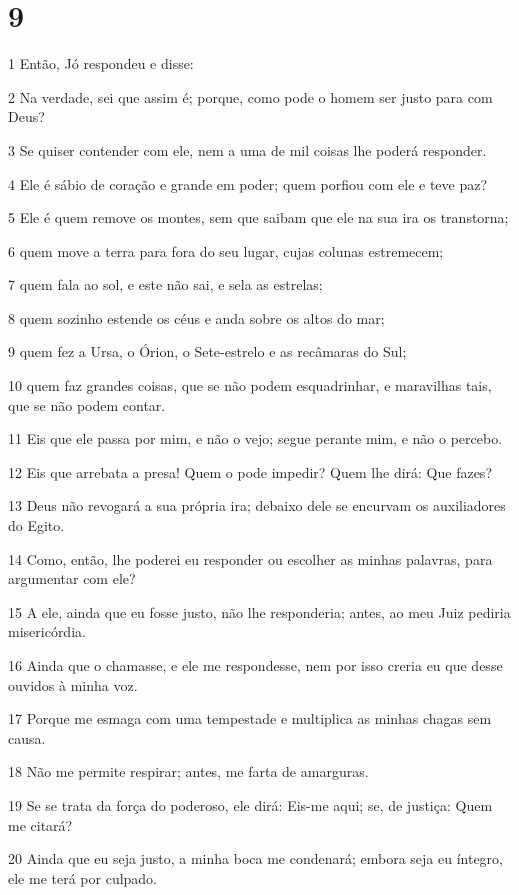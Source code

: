 \chapter{9}

\par 1 Então, Jó respondeu e disse:
\par 2 Na verdade, sei que assim é; porque, como pode o homem ser justo para com Deus?
\par 3 Se quiser contender com ele, nem a uma de mil coisas lhe poderá responder.
\par 4 Ele é sábio de coração e grande em poder; quem porfiou com ele e teve paz?
\par 5 Ele é quem remove os montes, sem que saibam que ele na sua ira os transtorna;
\par 6 quem move a terra para fora do seu lugar, cujas colunas estremecem;
\par 7 quem fala ao sol, e este não sai, e sela as estrelas;
\par 8 quem sozinho estende os céus e anda sobre os altos do mar;
\par 9 quem fez a Ursa, o Órion, o Sete-estrelo e as recâmaras do Sul;
\par 10 quem faz grandes coisas, que se não podem esquadrinhar, e maravilhas tais, que se não podem contar.
\par 11 Eis que ele passa por mim, e não o vejo; segue perante mim, e não o percebo.
\par 12 Eis que arrebata a presa! Quem o pode impedir? Quem lhe dirá: Que fazes?
\par 13 Deus não revogará a sua própria ira; debaixo dele se encurvam os auxiliadores do Egito.
\par 14 Como, então, lhe poderei eu responder ou escolher as minhas palavras, para argumentar com ele?
\par 15 A ele, ainda que eu fosse justo, não lhe responderia; antes, ao meu Juiz pediria misericórdia.
\par 16 Ainda que o chamasse, e ele me respondesse, nem por isso creria eu que desse ouvidos à minha voz.
\par 17 Porque me esmaga com uma tempestade e multiplica as minhas chagas sem causa.
\par 18 Não me permite respirar; antes, me farta de amarguras.
\par 19 Se se trata da força do poderoso, ele dirá: Eis-me aqui; se, de justiça: Quem me citará?
\par 20 Ainda que eu seja justo, a minha boca me condenará; embora seja eu íntegro, ele me terá por culpado.
